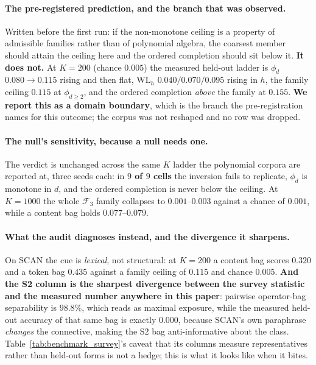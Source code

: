 \paragraph{The pre-registered prediction, and the branch that was observed.} Written before the first run: if the non-monotone ceiling is a property of admissible families rather than of polynomial algebra, the coarsest member should attain the ceiling here and the ordered completion should sit below it. \textbf{It does not.} At $K{=}200$ (chance $0.005$) the measured held-out ladder is $\phi_{d}$ $0.080 \to 0.115$ rising and then flat, $\mathrm{WL}_h$ $0.040/0.070/0.095$ rising in $h$, the family ceiling $0.115$ at $\phi_{d\geq2}$, and the ordered completion \emph{above} the family at $0.155$. \textbf{We report this as a domain boundary}, which is the branch the pre-registration names for this outcome; the corpus was not reshaped and no row was dropped.

\paragraph{The null's sensitivity, because a null needs one.} The verdict is unchanged across the same $K$ ladder the polynomial corpora are reported at, three seeds each: in \textbf{$9$ of $9$ cells} the inversion fails to replicate, $\phi_d$ is monotone in $d$, and the ordered completion is never below the ceiling. At $K{=}1000$ the whole $\mathcal{F}_3$ family collapses to $0.001$--$0.003$ against a chance of $0.001$, while a content bag holds $0.077$--$0.079$.

\paragraph{What the audit diagnoses instead, and the divergence it sharpens.} On SCAN the cue is \emph{lexical}, not structural: at $K{=}200$ a content bag scores $0.320$ and a token bag $0.435$ against a family ceiling of $0.115$ and chance $0.005$. \textbf{And the S2 column is the sharpest divergence between the survey statistic and the measured number anywhere in this paper}: pairwise operator-bag separability is $98.8\%$, which reads as maximal exposure, while the measured held-out accuracy of that same bag is exactly $0.000$, because SCAN's own paraphrase \emph{changes} the connective, making the S2 bag anti-informative about the class. Table~\ref{tab:benchmark_survey}'s caveat that its columns measure representatives rather than held-out forms is not a hedge; this is what it looks like when it bites.

